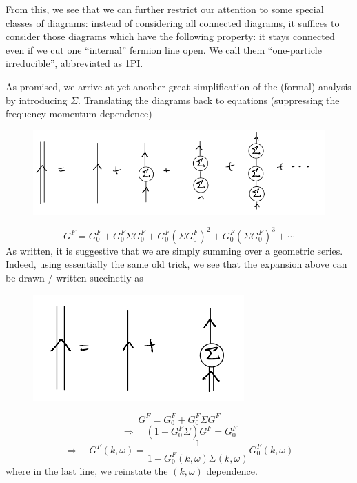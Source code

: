 From this, we see that we can further restrict our attention to some special classes of diagrams: instead of considering all connected diagrams, it suffices to consider those diagrams which have the following property: it stays connected even if we cut one ``internal'' fermion line open. We call them ``one-particle irreducible'', abbreviated as 1PI.

As promised, we arrive at yet another great simplification of the (formal) analysis by introducing $\Sigma$. Translating the diagrams back to equations (suppressing the frequency-momentum dependence)
\begin{figure}[H]
    \centering
    \includegraphics[width=\textwidth]{jupyterbook/data/fig/lec18-fig11.png}
\end{figure}
\[ G^F=G_{0}^{F}+G_{0}^{F}\Sigma G_{0}^{F}+G_{0}^{F}\left( \Sigma G_{0}^{F} \right) ^2+G_{0}^{F}\left( \Sigma G_{0}^{F} \right) ^3+\cdots \]
As written, it is suggestive that we are simply summing over a geometric series. Indeed, using essentially the same old trick, we see that the expansion above can be drawn / written succinctly as
\begin{figure}[H]
    \centering
    \includegraphics[width=\textwidth]{jupyterbook/data/fig/lec18-fig12.png}
\end{figure}
\[ G^F=G_{0}^{F}+G_{0}^{F}\Sigma G^F\]
\[ \Rightarrow \quad \left( 1-G_{0}^{F}\Sigma \right) G^F=G_{0}^{F}\]
\[ \Rightarrow \quad G^F\left( k,\omega \right) =\frac{1}{1-G_{0}^{F}\left( k,\omega \right) \Sigma \left( k,\omega \right)}G_{0}^{F}\left( k,\omega \right) \]
where in the last line, we reinstate the $(k,\omega)$ dependence.

